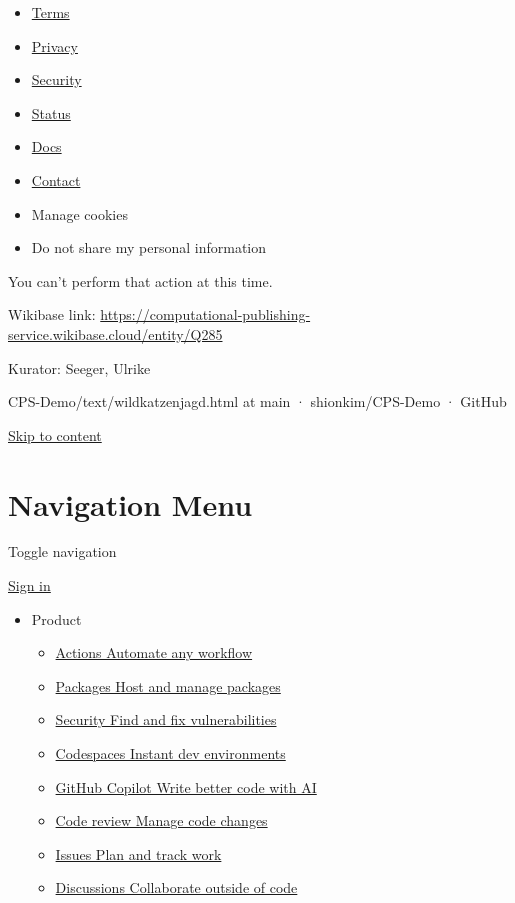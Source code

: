 \documentclass[
  letterpaper,
]{book}
\providecommand{\tightlist}{%
  \setlength{\itemsep}{0pt}\setlength{\parskip}{0pt}}\usepackage{longtable,booktabs,array}
\begin{document}
\begin{itemize}
\tightlist
\item
  \href{https://docs.github.com/site-policy/github-terms/github-terms-of-service}{Terms}
\item
  \href{https://docs.github.com/site-policy/privacy-policies/github-privacy-statement}{Privacy}
\item
  \href{https://github.com/security}{Security}
\item
  \href{https://www.githubstatus.com/}{Status}
\item
  \href{https://docs.github.com/}{Docs}
\item
  \href{https://support.github.com?tags=dotcom-footer}{Contact}
\item
  Manage cookies
\item
  Do not share my personal information
\end{itemize}

You can't perform that action at this time.

Wikibase link:
\url{https://computational-publishing-service.wikibase.cloud/entity/Q285}

Kurator: Seeger, Ulrike

CPS-Demo/text/wildkatzenjagd.html at main · shionkim/CPS-Demo · GitHub

\hyperref[start-of-content]{Skip to content}

\section{Navigation Menu}\label{navigation-menu-1}

Toggle navigation

\href{./login?return_to=https\%3A\%2F\%2Fgithub.com\%2Fshionkim\%2FCPS-Demo\%2Fblob\%2Fmain\%2Ftext\%2Fwildkatzenjagd.html}{Sign
in}

\begin{itemize}
\item
  Product

  \begin{itemize}
  \tightlist
  \item
    \href{https://github.com/features/actions}{Actions Automate any
    workflow}
  \item
    \href{https://github.com/features/packages}{Packages Host and manage
    packages}
  \item
    \href{https://github.com/features/security}{Security Find and fix
    vulnerabilities}
  \item
    \href{https://github.com/features/codespaces}{Codespaces Instant dev
    environments}
  \item
    \href{https://github.com/features/copilot}{GitHub Copilot Write
    better code with AI}
  \item
    \href{https://github.com/features/code-review}{Code review Manage
    code changes}
  \item
    \href{https://github.com/features/issues}{Issues Plan and track
    work}
  \item
    \href{https://github.com/features/discussions}{Discussions
    Collaborate outside of code}
  \end{itemize}
\end{itemize}
\end{document}

